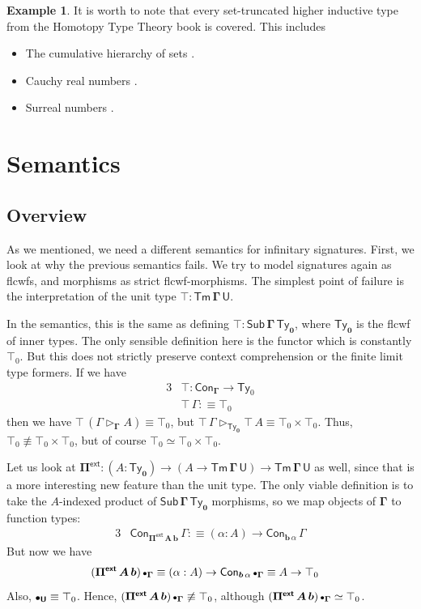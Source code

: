 \documentclass[12pt,a4paper,twoside,openany]{book}
\theoremstyle{remark}
\theoremstyle{definition}
\newtheorem{myexample}{Example}
\theoremstyle{theorem}
\newcommand{\bs}[1]{\boldsymbol{#1}}
\newcommand{\Con}{\mathsf{Con}}
\newcommand{\Sub}{\mathsf{Sub}}
\newcommand{\Tm}{\mathsf{Tm}}
\newcommand{\Ty}{\mathsf{Ty}}
\newcommand{\U}{\mathsf{U}}
\newcommand{\ext}{\triangleright}
\newcommand{\emptycon}{\scaleobj{.75}\bullet}
\newcommand{\Piinf}{\Pi^{\mathsf{ext}}}
\newcommand{\bGamma}{\bs{\Gamma}}
\newcommand{\bb}{\bs{b}}
\newcommand{\bemptycon}{\scaleobj{.75}{\bs{\bullet}}}
\newcommand{\bU}{\bs{\U}}
\newcommand{\defn}{:\equiv}
\begin{document}
\begin{myexample}
It is worth to note that every set-truncated higher inductive type from the
Homotopy Type Theory book \cite{hottbook} is covered. This includes
\begin{itemize}
\item The cumulative hierarchy of sets \cite[Section~10.5]{hottbook}.
\item Cauchy real numbers \cite[Section~11.3]{hottbook}.
\item Surreal numbers \cite[Section~11.6]{hottbook}.
\end{itemize}
\end{myexample}

\section{Semantics}

\subsection{Overview}

As we mentioned, we need a different semantics for infinitary signatures.
First, we look at why the previous semantics fails. We try to model signatures
again as flcwfs, and morphisms as strict flcwf-morphisms. The simplest point of
failure is the interpretation of the unit type $\bs{\top : \Tm\,\Gamma\,\U}$.

In the semantics, this is the same as defining $\bs{\top :
  \Sub\,\Gamma\,\Ty_0}$, where $\bs{\Ty_0}$ is the flcwf of inner types. The
only sensible definition here is the functor which is constantly $\top_0$. But
this does not strictly preserve context comprehension or the finite limit type formers.
If we have
\begin{alignat*}{3}
  &\bs{\top} : \Con_{\bGamma} \to \Ty_0\\
  &\bs{\top}\,\Gamma \defn \top_0
\end{alignat*}
then we have $\bs{\top}\,(\Gamma \ext_{\bGamma} A) \equiv \top_0$, but
$\bs{\top}\,\Gamma \ext_{\bs{\Ty_0}} \bs{\top}\,A \equiv \top_0 \times \top_0$.
Thus, $\top_0 \not\equiv \top_0 \times \top_0$, but of course $\top_0 \simeq
\top_0 \times \top_0$.

Let us look at $\bs{\Piinf} : (A : \bs{\Ty_0}) \to (A \to \bs{\Tm\,\Gamma\,\U}) \to
\bs{\Tm\,\Gamma\,\U}$ as well, since that is a more interesting new feature than the
unit type. The only viable definition is to take the $A$-indexed product of
$\bs{\Sub\,\Gamma\,\Ty_0}$ morphisms, so we map objects of $\bGamma$ to function types:
\begin{alignat*}{3}
  &\Con_{\bs{\Piinf\,A\,b}}\,\Gamma \defn (\alpha : A) \to \Con_{\bb\,\alpha}\,\Gamma
\end{alignat*}
But now we have
\begin{alignat*}{3}
  &(\bs{\Piinf\,A\,b})\,\emptycon_{\bGamma}
     \equiv (\alpha : A) \to \Con_{\bb\,\alpha}\,\emptycon_{\bGamma}
     \equiv A \to \top_0
\end{alignat*}
Also, $\bemptycon_{\bU} \equiv \top_0$. Hence,
$(\bs{\Piinf\,A\,b})\,\emptycon_{\bGamma} \not\equiv \top_0$, although
$(\bs{\Piinf\,A\,b})\,\emptycon_{\bGamma} \simeq \top_0$.
\end{document}
